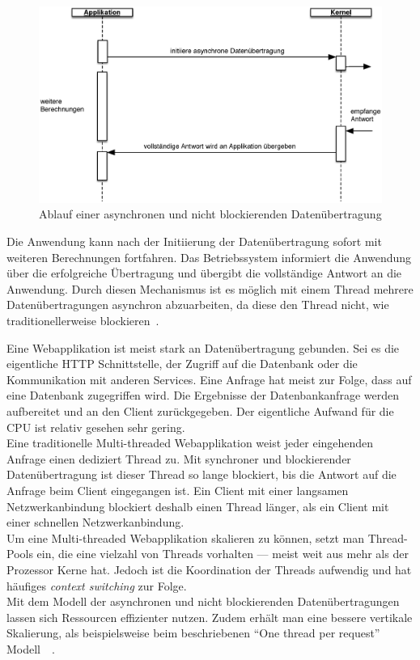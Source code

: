 \begin{figure}[H]
 \centering
 \includegraphics[width=1.0\textwidth]{4-Hauptteil/async-io/async-io.eps}
 \caption{Ablauf einer asynchronen und nicht blockierenden Datenübertragung}
 \label{fig:async-io}
\end{figure}

Die Anwendung kann nach der Initiierung der Datenübertragung sofort mit weiteren Berechnungen fortfahren. Das Betriebssystem informiert die Anwendung über die erfolgreiche Übertragung und übergibt die vollständige Antwort an die Anwendung. Durch diesen Mechanismus ist es möglich mit einem Thread mehrere Datenübertragungen asynchron abzuarbeiten, da diese den Thread nicht, wie traditionellerweise blockieren~\cite{jones_boost_2006}.

\pagebreak

Eine Webapplikation ist meist stark an Datenübertragung gebunden. Sei es die eigentliche HTTP Schnittstelle, der Zugriff auf die Datenbank oder die Kommunikation mit anderen Services. Eine Anfrage hat meist zur Folge, dass auf eine Datenbank zugegriffen wird. Die Ergebnisse der Datenbankanfrage werden aufbereitet und an den Client zurückgegeben. Der eigentliche Aufwand für die CPU ist relativ gesehen sehr gering.\\
Eine traditionelle Multi-threaded Webapplikation weist jeder eingehenden Anfrage einen dediziert Thread zu. Mit synchroner und blockierender Datenübertragung ist dieser Thread so lange blockiert, bis die Antwort auf die Anfrage beim Client eingegangen ist. Ein Client mit einer langsamen Netzwerkanbindung blockiert deshalb einen Thread länger, als ein Client mit einer schnellen Netzwerkanbindung.\\
Um eine Multi-threaded Webapplikation skalieren zu können, setzt man Thread-Pools ein, die eine vielzahl von Threads vorhalten --- meist weit aus mehr als der Prozessor Kerne hat. Jedoch ist die Koordination der Threads aufwendig und hat häufiges \textit{context switching} zur Folge.\\
Mit dem Modell der asynchronen und nicht blockierenden Datenübertragungen lassen sich Ressourcen effizienter nutzen. Zudem erhält man eine bessere vertikale Skalierung, als beispielsweise beim beschriebenen \enquote{One thread per request} Modell~\cite[S.~171]{butcher_seven_2014}~\cite[S.~76]{erb_concurrent_2012}.

